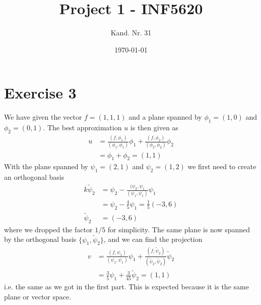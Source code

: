 \documentclass[a4paper,10pt]{article}
\title{Project 1 - INF5620}
\date{\today}
\author{Kand. Nr. 31}
\renewcommand{\(}{\left(}
\renewcommand{\)}{\right)}
\newcommand{\f}[2]{\frac{#1}{#2}}
\begin{document}
\section*{Exercise 3}
We have given the vector $f=(1,1,1)$ and a plane spanned by $\phi_1=(1,0)$ and $\phi_2=(0,1)$. The best approximation $u$ is then given as
\begin{align*}
u &= \frac{(f,\phi_1)}{(\phi_1,\phi_1)}\phi_1 + \frac{(f,\phi_2)}{(\phi_2,\phi_2)}\phi_2\\
  &= \phi_1+\phi_2 = (1,1)
\end{align*}
With the plane spanned by $\psi_1=(2,1)$ and $\psi_2=(1,2)$ we first need to create an orthogonal basis
\begin{align*}
  k\tilde \psi_2 &= \psi_2 - \f{(\psi_2,\psi_1}{(\psi_1,\psi_1)}\psi_1\\
  &= \psi_2 - \f{4}{5}\psi_1 = \f{1}{5}(-3,6)\\
  \tilde \psi_2 &= (-3,6)
\end{align*}
where we dropped the factor $1/5$ for simplicity. The same plane is now spanned by the orthogonal basis $\{\psi_1,\tilde \psi_2\}$, and we can find the projection
\begin{align*}
v &= \frac{(f,\psi_1)}{(\psi_1,\psi_1)}\psi_1 + \frac{(f,\tilde\psi_2)}{(\tilde\psi_2,\tilde\psi_2)}\tilde\psi_2\\
  &= \f{3}{5}\psi_1 + \f{3}{45}\tilde\psi_2 = (1,1)
\end{align*}
i.e. the same as we got in the first part. This is expected because it is the same plane or vector space. 
\end{document}
